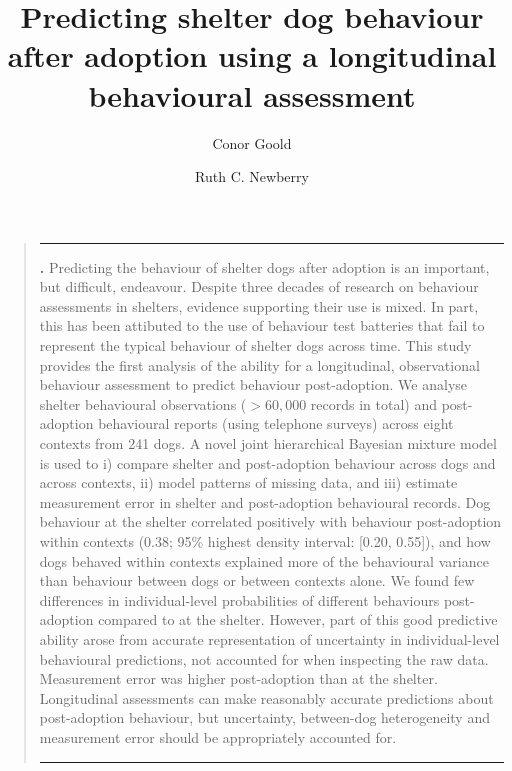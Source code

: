 \documentclass[12pt]{article}
\title{Predicting shelter dog behaviour after adoption using a longitudinal behavioural assessment}
\author[1,2]{Conor Goold}
\author[2]{Ruth C. Newberry}
\affil[1]{\small{Faculty of Biological Sciences, University of Leeds, UK, LS2 9JT}}
\affil[2]{\small{Department of Animal and Aquacultural Sciences, Norwegian University of Life Sciences, \r{A}s, Norway}}
\date{}
\renewenvironment{abstract}
{\begin{quote}
\small
\noindent \rule{\linewidth}{.5pt}\par{\bfseries \abstractname.}}
{\medskip\noindent \rule{\linewidth}{.5pt}
\end{quote}
}
\begin{document}
\linenumbers
\modulolinenumbers[5]

\maketitle

\begin{abstract}
  \small
  Predicting the behaviour of shelter dogs after adoption is an important, but difficult, endeavour. Despite three decades of research on behaviour assessments in shelters, evidence supporting their use is mixed. In part, this has been attibuted to the use of behaviour test batteries that fail to represent the typical behaviour of shelter dogs across time. This study provides the first analysis of the ability for a longitudinal, observational behaviour assessment to predict behaviour post-adoption. We analyse shelter behavioural observations ($> 60,000$ records in total) and post-adoption behavioural reports (using telephone surveys) across eight contexts from 241 dogs. A novel joint hierarchical Bayesian mixture model is used to i) compare shelter and post-adoption behaviour across dogs and across contexts, ii) model patterns of missing data, and iii) estimate measurement error in shelter and post-adoption behavioural records. Dog behaviour at the shelter correlated positively with behaviour post-adoption within contexts (0.38; 95\% highest density interval: [0.20, 0.55]), and how dogs behaved within contexts explained more of the behavioural variance than behaviour between dogs or between contexts alone. We found few differences in individual-level probabilities of different behaviours post-adoption compared to at the shelter. However, part of this good predictive ability arose from accurate representation of uncertainty in individual-level behavioural predictions, not accounted for when inspecting the raw data. Measurement error was higher post-adoption than at the shelter. Longitudinal assessments can make reasonably accurate predictions about post-adoption behaviour, but uncertainty, between-dog heterogeneity and measurement error should be appropriately accounted for.\\
\end{abstract}
\newpage
\tableofcontents
\end{document}
